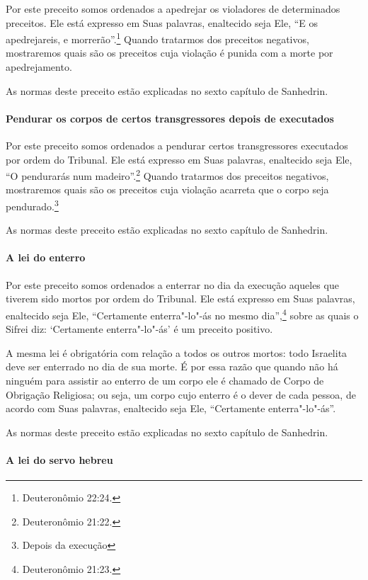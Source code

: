 \begin{multicols}{2}
Por este preceito somos ordenados a apedrejar os violadores de
determinados preceitos. Ele está expresso em Suas palavras, enaltecido
seja Ele, ``E os apedrejareis, e morrerão''.\footnote{Deuteronômio 22:24.} Quando
tratarmos dos preceitos negativos, mostraremos quais são os preceitos
cuja violação é punida com a morte por apedrejamento.

As normas deste preceito estão explicadas no sexto capítulo de Sanhedrin\starr.


\paragraph{Pendurar os corpos de certos transgressores depois de executados}

Por este preceito somos ordenados a pendurar certos transgressores
executados por ordem do Tribunal. Ele está expresso em Suas palavras,
enaltecido seja Ele, ``O pendurarás num madeiro''.\footnote{Deuteronômio 21:22.}
Quando tratarmos dos preceitos negativos, mostraremos quais são os
preceitos cuja violação acarreta que o corpo seja
pendurado.\footnote{Depois da execução}

As normas deste preceito estão explicadas no sexto capítulo de Sanhedrin\starr.

\paragraph{A lei do enterro}

Por este preceito somos ordenados a enterrar no dia da execução aqueles
que tiverem sido mortos por ordem do Tribunal. Ele está expresso em Suas
palavras, enaltecido seja Ele, ``Certamente enterra"-lo"-ás no mesmo dia'',\footnote{Deuteronômio 21:23.} sobre as quais o Sifrei\starr{} diz: `Certamente
enterra"-lo"-ás' é um preceito positivo.

A mesma lei é obrigatória com relação a todos os outros mortos: todo
Israelita deve ser enterrado no dia de sua morte. É por essa razão que
quando não há ninguém para assistir ao enterro de um corpo ele é
chamado de Corpo de Obrigação Religiosa; ou seja, um corpo cujo enterro
é o dever de cada pessoa, de acordo com Suas palavras, enaltecido seja
Ele, ``Certamente enterra"-lo"-ás''.

As normas deste preceito estão explicadas no sexto capítulo de Sanhedrin\starr.

\paragraph{A lei do servo hebreu}


\end{multicols}
